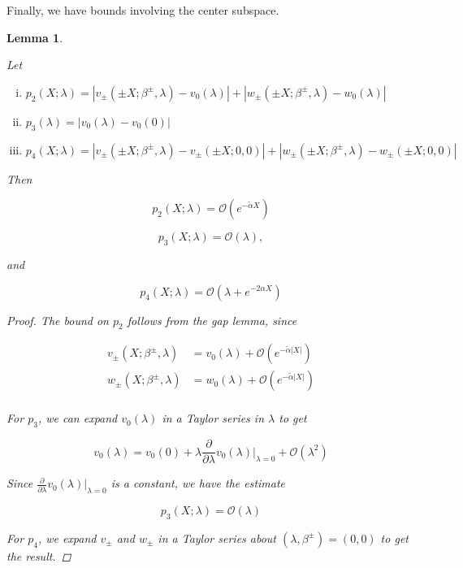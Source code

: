 \documentclass[12pt]{article}
\newtheorem{lemma}{Lemma}
\begin{document}
Finally, we have bounds involving the center subspace.


\begin{lemma}\label{centerbounds}

Let
\begin{enumerate}[(i)]
\item $p_2(X; \lambda) = |v_\pm(\pm X; \beta^\pm, \lambda) - v_0(\lambda)| + |w_\pm(\pm X; \beta^\pm, \lambda) - w_0(\lambda)|$
\item $p_3(\lambda) = |v_0(\lambda) - v_0(0)|$
\item $p_4(X; \lambda) = |v_\pm(\pm X; \beta^\pm, \lambda) - v_\pm(\pm X; 0, 0)| + |w_\pm(\pm X; \beta^\pm, \lambda) - w_\pm(\pm X; 0, 0)|$
\end{enumerate}

Then 

\begin{equation}\label{p2limit}
p_2(X; \lambda) = \mathcal{O}(e^{-\tilde{\alpha} X} )
\end{equation}

\begin{equation}\label{p3bound}
p_3(X; \lambda) = \mathcal{O}(\lambda),
\end{equation}

and

\begin{equation}\label{p3bound}
p_4(X; \lambda) = \mathcal{O}(\lambda + e^{-2 \alpha X} )
\end{equation}

\begin{proof}

The bound on $p_2$ follows from the gap lemma, since

\begin{align*}
v_\pm(X; \beta^\pm, \lambda) &= v_0(\lambda) + \mathcal{O}(e^{-\tilde{\alpha}|X|}) \\
w_\pm(X; \beta^\pm, \lambda) &= w_0(\lambda) + \mathcal{O}(e^{-\tilde{\alpha}|X|})\\
\end{align*}

For $p_3$, we can expand $v_0(\lambda)$ in a Taylor series in $\lambda$ to get

\[
v_0(\lambda) = v_0(0) + \lambda \frac{\partial}{\partial \lambda}v_0(\lambda)\Big|_{\lambda = 0} + \mathcal{O}(\lambda^2)
\]

Since $\frac{\partial}{\partial \lambda}v_0(\lambda)\Big|_{\lambda = 0}$ is a constant, we have the estimate

\[
p_3(X; \lambda) = \mathcal{O}(\lambda) 
\]

For $p_4$, we expand $v_\pm$ and $w_\pm$ in a Taylor series about $(\lambda, \beta^\pm) = (0, 0)$ to get the result.

\end{proof}
\end{lemma}
\end{document}
